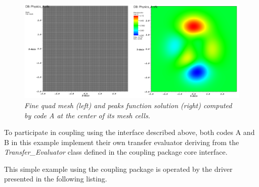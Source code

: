 \documentclass[letterpaper]{article}
\begin{document}
\begin{figure}[htpb!]
  \begin{center}
    \includegraphics[width=6in]{images/sol_A.png}
  \end{center}
  \caption{\small \sl Fine quad mesh (left) and peaks function
    solution (right) computed by code A at the center of its mesh
    cells.} 
  \label{fig:sol_A}
\end{figure}

To participate in coupling using the interface described above, both
codes A and B in this example implement their own transfer evaluator
deriving from the {\sl Transfer\_Evaluator} class defined in the coupling
package core interface.

This simple example using the coupling package is operated by the
driver presented in the following listing.
\end{document}
